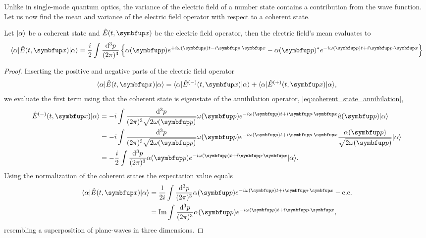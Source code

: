 Unlike in single-mode quantum optics, the variance of the electric field of a number state contains a contribution from the wave function.
Let us now find the mean and variance of the electric field operator with respect to a coherent state.
\begin{theorem}
	Let $\lvert\alpha\rangle$ be a coherent state and $\hat{E}(t,\vb{x})$ be the electric field operator, then the electric field's mean evaluates to
	\begin{equation}
		\bra{\alpha}
		\hat{E}(t,\vb{x})
		\ket{\alpha}
		=
		\frac{i}{2}
		\int\frac{\dd[3]{p}}{(2\pi)^3}
		\left\{
			\alpha(\vb{p})
			e^{+i\omega(\vb{p})t-i\vb{p}\vdot\vb{x}}
			-
			\alpha(\vb{p})^*
			e^{-i\omega(\vb{p})t+i\vb{p}\vdot\vb{x}}
		\right\}
	\end{equation}
\end{theorem}
\begin{proof}
	Inserting the positive and negative parts of the electric field operator
	\begin{equation}
		\bra{\alpha}
		\hat{E}(t,\vb{x})
		\ket{\alpha}
		=
		\bra{\alpha}
		\hat{E}^{(-)}(t,\vb{x})
		\ket{\alpha}
		+
		\bra{\alpha}
		\hat{E}^{(+)}(t,\vb{x})
		\ket{\alpha}
		,
	\end{equation}
	we evaluate the first term using that the coherent state is eigenstate of the annihilation operator, \cref{eq:coherent_state_annihilation},
	\begin{equation*}
		\begin{split}
			\hat{E}^{(-)}(t,\vb{x})
			\ket{\alpha}
			&=
			-i\int\frac{\dd[3]{p}}{(2\pi)^3\sqrt{2\omega(\vb{p})}}
			\omega(\vb{p})
			e^{-i\omega(\vb{p})t+i\vb{p}\vdot\vb{x}}
			\hat{a}(\vb{p})
			\ket{\alpha}
			\\
			&=
			-i\int\frac{\dd[3]{p}}{(2\pi)^3\sqrt{2\omega(\vb{p})}}
			\omega(\vb{p})
			e^{-i\omega(\vb{p})t+i\vb{p}\vdot\vb{x}}
			\frac{\alpha(\vb{p})}{\sqrt{2\omega(\vb{p})}}
			\ket{\alpha}
			\\
			&=
			-\frac{i}{2}
			\int\frac{\dd[3]{p}}{(2\pi)^3}
			\alpha(\vb{p})
			e^{-i\omega(\vb{p})t+i\vb{p}\vdot\vb{x}}
			\ket{\alpha}
			.
		\end{split}
	\end{equation*}
	Using the normalization of the coherent states the expectation value equals
	\begin{equation}
		\begin{split}
			\bra{\alpha}
			\hat{E}(t,\vb{x})
			\ket{\alpha}
			&=
			\frac{1}{2i}
			\int\frac{\dd[3]{p}}{(2\pi)^3}
			\alpha(\vb{p})
			e^{-i\omega(\vb{p})t+i\vb{p}\vdot\vb{x}}
			-
			\text{c.c.}
			\\
			&=
			\Im
			\int\frac{\dd[3]{p}}{(2\pi)^3}
			\alpha(\vb{p})
			e^{-i\omega(\vb{p})t+i\vb{p}\vdot\vb{x}}
			,
		\end{split}
	\end{equation}
	resembling a superposition of plane-waves in three dimensions.
\end{proof}
